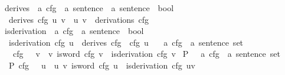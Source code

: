 \begin{isabellebody}
\isanewline
{}\isamarkupfalse%
\ derives\ {\isacharcolon}{\kern0pt}{\isacharcolon}{\kern0pt}\ {\isachardoublequoteopen}{\isacharprime}{\kern0pt}a\ cfg\ {\isasymRightarrow}\ {\isacharprime}{\kern0pt}a\ sentence\ {\isasymRightarrow}\ {\isacharprime}{\kern0pt}a\ sentence\ {\isasymRightarrow}\ bool{\isachardoublequoteclose}\ \isanewline
\ \ {\isachardoublequoteopen}derives\ cfg\ u\ v\ {\isacharequal}{\kern0pt}\ {\isacharparenleft}{\kern0pt}{\isacharparenleft}{\kern0pt}u{\isacharcomma}{\kern0pt}\ v{\isacharparenright}{\kern0pt}\ {\isasymin}\ derivations\ cfg{\isacharparenright}{\kern0pt}{\isachardoublequoteclose}\isanewline
\isanewline
{}\isamarkupfalse%
\ is{\isacharunderscore}{\kern0pt}derivation\ {\isacharcolon}{\kern0pt}{\isacharcolon}{\kern0pt}\ {\isachardoublequoteopen}{\isacharprime}{\kern0pt}a\ cfg\ {\isasymRightarrow}\ {\isacharprime}{\kern0pt}a\ sentence\ {\isasymRightarrow}\ bool{\isachardoublequoteclose}\ \isanewline
\ \ {\isachardoublequoteopen}is{\isacharunderscore}{\kern0pt}derivation\ cfg\ u\ {\isacharequal}{\kern0pt}\ derives\ cfg\ {\isacharbrackleft}{\kern0pt}{\isasymSS}\ cfg{\isacharbrackright}{\kern0pt}\ u{\isachardoublequoteclose}\isanewline
\isanewline
{}\isamarkupfalse%
\ {\isasymL}\ {\isacharcolon}{\kern0pt}{\isacharcolon}{\kern0pt}\ {\isachardoublequoteopen}{\isacharprime}{\kern0pt}a\ cfg\ {\isasymRightarrow}\ {\isacharprime}{\kern0pt}a\ sentence\ set{\isachardoublequoteclose}\ \isanewline
\ \ {\isachardoublequoteopen}{\isasymL}\ cfg\ {\isacharequal}{\kern0pt}\ {\isacharbraceleft}{\kern0pt}\ v\ {\isacharbar}{\kern0pt}\ v{\isachardot}{\kern0pt}\ is{\isacharunderscore}{\kern0pt}word\ cfg\ v\ {\isasymand}\ is{\isacharunderscore}{\kern0pt}derivation\ cfg\ v{\isacharbraceright}{\kern0pt}{\isachardoublequoteclose}\isanewline
\isanewline
{}\isamarkupfalse%
\ {\isachardoublequoteopen}{\isasymL}\isactrlsub P{\isachardoublequoteclose}\ \ {\isacharcolon}{\kern0pt}{\isacharcolon}{\kern0pt}\ {\isachardoublequoteopen}{\isacharprime}{\kern0pt}a\ cfg\ {\isasymRightarrow}\ {\isacharprime}{\kern0pt}a\ sentence\ set{\isachardoublequoteclose}\ \isanewline
\ \ {\isachardoublequoteopen}{\isasymL}\isactrlsub P\ cfg\ {\isacharequal}{\kern0pt}\ {\isacharbraceleft}{\kern0pt}\ u\ {\isacharbar}{\kern0pt}\ u\ v{\isachardot}{\kern0pt}\ is{\isacharunderscore}{\kern0pt}word\ cfg\ u\ {\isasymand}\ is{\isacharunderscore}{\kern0pt}derivation\ cfg\ {\isacharparenleft}{\kern0pt}u{\isacharat}{\kern0pt}v{\isacharparenright}{\kern0pt}\ {\isacharbraceright}{\kern0pt}{\isachardoublequoteclose}%
\isadelimdocument
%
\endisadelimdocument
%
\isatagdocument
%
\isamarkuptrue%
%
\endisatagdocument
{\isafolddocument}%
%
\isadelimdocument
%
\endisadelimdocument
%
\isadelimtheory
%
\endisadelimtheory
%
\isatagtheory
%
\endisatagtheory
{\isafoldtheory}%
%
\isadelimtheory
%
\endisadelimtheory
%
\end{isabellebody}%
